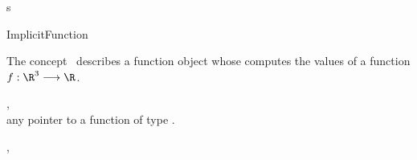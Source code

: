 s


\begin{ccRefConcept}{ImplicitFunction}

\ccDefinition
  
The concept \ccRefName\ describes a function object
whose  computes the values of a function
\begin{math}f : \R^3 \longrightarrow \R\end{math}.

\ccTypes




\ccOperations


\ccHasModels

,\\
any pointer to a function of type .

\ccSeeAlso
{},\\







\end{ccRefConcept}


